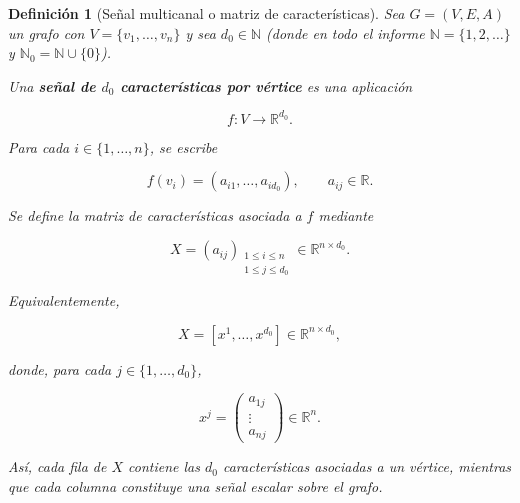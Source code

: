\documentclass[a4paper,openany,oneside,10pt]{report}
\theoremstyle{pnlTeorema}
\theoremstyle{pnlDefinicion}
\newtheorem{definicion}{Definición}[section]
\theoremstyle{pnlObservacion}
\begin{document}
\begin{definicion}[Señal multicanal o matriz de características]\label{def:senal-multicanal}
Sea \(G=(V,E,A)\) un grafo con \(V=\{v_1,\ldots,v_n\}\) y sea \(d_0\in\mathbb N\) (donde en todo el informe \(\mathbb N=\{1,2,\ldots\}\) y \(\mathbb N_0=\mathbb N\cup\{0\}\)).

Una \textbf{señal de \(d_0\) características por vértice} es una aplicación

\[
f:V\longrightarrow\mathbb R^{d_0}.
\]

Para cada \(i\in\{1,\ldots,n\}\), se escribe

\[
f(v_i)=(a_{i1},\ldots,a_{id_0}),
\qquad a_{ij}\in\mathbb R.
\]

Se define la matriz de características asociada a \(f\) mediante

\[
X=(a_{ij})_{\substack{1\le i\le n\\1\le j\le d_0}}
\in\mathbb R^{n\times d_0}.
\]

Equivalentemente,

\[
X=[x^1,\ldots,x^{d_0}]
\in\mathbb R^{n\times d_0},
\]

donde, para cada \(j\in\{1,\ldots,d_0\}\),

\[
x^j=
\begin{pmatrix}
a_{1j}\\
\vdots\\
a_{nj}
\end{pmatrix}
\in\mathbb R^n.
\]

Así, cada fila de \(X\) contiene las \(d_0\) características asociadas a un vértice, mientras que cada columna constituye una señal escalar sobre el grafo.
\end{definicion}
\end{document}
